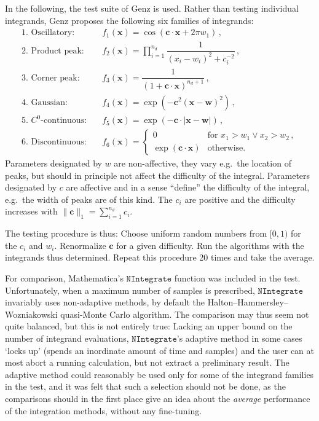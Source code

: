 \documentclass[12pt]{article}
\newcommand\eg{e.g.\ }
\newcommand\dvec[1]{\mathbf{#1}}
\newcommand\norm[1]{\|#1\|_1}
\newcommand\Code[1]{\ensuremath{\texttt{#1}}}
\begin{document}
In the following, the test suite of Genz \cite{Genz} is used.  Rather
than testing individual integrands, Genz proposes the following six
families of integrands:
\begin{equation}
\label{eq:families}
\begin{array}{ll}
\text{1. Oscillatory:} &
  f_1(\dvec x) = \cos(\dvec c\cdot\dvec x + 2\pi w_1)\,, \\[2ex]
\text{2. Product peak:} &
  f_2(\dvec x) = \prod\limits_{i = 1}^{n_d}
    \dfrac 1{(x_i - w_i)^2 + c_i^{-2}}\,, \\[3ex]
\text{3. Corner peak:} &
  f_3(\dvec x) = \dfrac 1{(1 + \dvec c\cdot\dvec x)^{n_d + 1}}\,, \\[3ex]
\text{4. Gaussian:} &
  f_4(\dvec x) = \exp(-\dvec c^2 (\dvec x - \dvec w)^2)\,, \\[2ex]
\text{5. $C^0$-continuous:}\quad &
  f_5(\dvec x) = \exp(-\dvec c\cdot |\dvec x - \dvec w|)\,, \\[2ex]
\text{6. Discontinuous:} &
  f_6(\dvec x) = \begin{cases}
    0 & \text{for }x_1 > w_1 \vee x_2 > w_2\,, \\
    \exp(\dvec c\cdot\dvec x) & \text{otherwise}.
  \end{cases}
\end{array}
\end{equation}
Parameters designated by $w$ are non-affective, they vary \eg the 
location of peaks, but should in principle not affect the difficulty of 
the integral.  Parameters designated by $c$ are affective and in a sense
``define'' the difficulty of the integral, \eg the width of peaks are of
this kind.  The $c_i$ are positive and the difficulty increases with
$\norm{\dvec c} = \sum_{i = 1}^{n_d} c_i$.

The testing procedure is thus: Choose uniform random numbers from
$[0,1)$ for the $c_i$ and $w_i$.  Renormalize $\dvec c$ for a given
difficulty.  Run the algorithms with the integrands thus determined. 
Repeat this procedure 20 times and take the average.

For comparison, Mathematica's \Code{NIntegrate} function was included
in the test.  Unfortunately, when a maximum number of samples is
prescribed, \Code{NIntegrate} invariably uses non-adaptive methods, by
default the Halton--Hammersley--Wozniakowski quasi-Monte Carlo
algorithm.  The comparison may thus seem not quite balanced, but this is
not entirely true: Lacking an upper bound on the number of integrand
evaluations, \Code{NIntegrate}'s adaptive method in some cases `locks
up' (spends an inordinate amount of time and samples) and the user can
at most abort a running calculation, but not extract a preliminary
result.  The adaptive method could reasonably be used only for some of
the integrand families in the test, and it was felt that such a
selection should not be done, as the comparisons should in the first
place give an idea about the \emph{average} performance of the
integration methods, without any fine-tuning.
\end{document}
